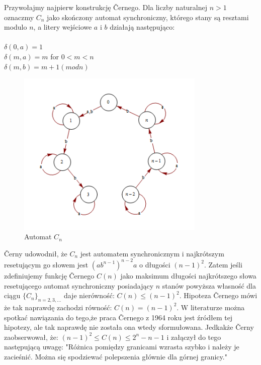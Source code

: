 \documentclass[12pt,a4paper]{article}
\begin{document}
Przywo{\l}ajmy najpierw konstrukcj\k{e} \v Cernego. Dla liczby naturalnej $n>1$ oznaczmy $C_{n}$ jako sko\'nczony automat synchroniczny, kt\'orego stany s\k{a} resztami modulo $n$, a litery wej\'sciowe $a$ i $b$ dzia{\l}aj\k{a} nast\k{e}puj\k{a}co:\\
\\
$\delta(0,a)=1$\\
$\delta(m,a)=m$ for $0<m<n$\\
$\delta(m,b)=m+1(modn)$
\begin{figure}[H]
    \centering
    \includegraphics[width=0.8\textwidth]{rysunek7}
    \caption{Automat $C_{n}$}
    \label{fig:rysunek7}
\end{figure}

\v Cerny udowodni{\l}, \.ze $C_{n}$ jest automatem synchronicznym i najkr\'otszym resetuj\k{a}cym go s{\l}owem jest $(ab^{n-1})^{n-2}a$ o d{\l}ugo\'sci $(n-1)^{2}$. Zatem je\'sli zdefiniujemy funkcj\k{e} \v Cernego $C(n)$ jako maksimum d{\l}ugo\'sci najkr\'otszego s{\l}owa resetuj\k{a}cego automat synchroniczny posiadaj\k{a}cy $n$ stan\'ow powy\.zsza w{\l}asno\'s\'c dla ci\k{a}gu $\{C_{n}\}_{n=2,3,\ldots}$ daje nier\'owno\'s\'c: $C(n)\leq(n-1)^{2}$. Hipoteza \v Cernego m\'owi \.ze tak naprawd\k{e} zachodzi r\'owno\'s\'c: $C(n)=(n-1)^{2}$. W literaturze mo\.zna spotka\'c nawi\k{a}zania do tego,\.ze praca \v Cernego z 1964 roku jest \'zr\'od{\l}em tej hipotezy, ale tak naprawd\k{e} nie zosta{\l}a ona wtedy sformu{\l}owana. Jedkak\.ze \v Cerny zaobserwowa{\l}, \.ze: $(n-1)^{2}\leq C(n)\leq2^{n}-n-1$ i za{\l}\k{a}czy{\l} do tego nast\k{e}puj\k{a}c\k{a} uwag\k{e}: "R\'o\.znica pomi\k{e}dzy granicami wzrasta szybko i nale\.zy je zacie\'sni\'c. Mo\.zna si\k{e} spodziewa\'c polepszenia g{\l}\'ownie dla g\'ornej granicy."
\end{document}
